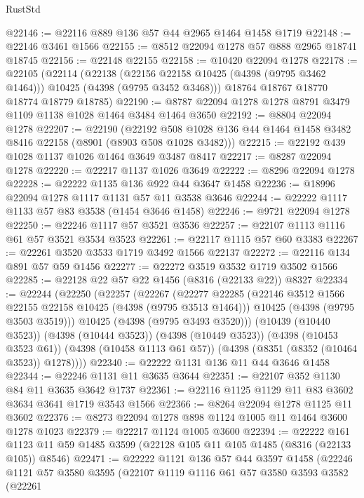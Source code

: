 \begin{lexlean}{RustStd}
\begin{coremodule}
@22146 := @22116 @889 @136 @57 @44 @2965 @1464 @1458 @1719
@22148 := @22146 @3461 @1566
@22155 := @8512 @22094 @1278 @57 @888 @2965 @18741 @18745
@22156 := @22148 @22155
@22158 := @10420 @22094 @1278
@22178 := @22105
    (@22114
      (@22138 (@22156 @22158 @10425 (@4398 (@9795 @3462 @1464))) @10425 (@4398 (@9795 @3452 @3468)))
      @18764
      @18767
      @18770
      @18774
      @18779
      @18785)
@22190 := @8787 @22094 @1278 @1278 @8791 @3479 @1109 @1138 @1028 @1464 @3484 @1464 @3650
@22192 := @8804 @22094 @1278
@22207 := @22190
    (@22192 @508 @1028 @136 @44 @1464 @1458 @3482 @8416 @22158 (@8901 (@8903 @508 @1028 @3482)))
@22215 := @22192 @439 @1028 @1137 @1026 @1464 @3649 @3487 @8417
@22217 := @8287 @22094 @1278
@22220 := @22217 @1137 @1026 @3649
@22222 := @8296 @22094 @1278
@22228 := @22222 @1135 @136 @922 @44 @3647 @1458
@22236 := @18996 @22094 @1278 @1117 @1131 @57 @11 @3538 @3646
@22244 := @22222 @1117 @1133 @57 @83 @3538 (@1454 @3646 @1458)
@22246 := @9721 @22094 @1278
@22250 := @22246 @1117 @57 @3521 @3536
@22257 := @22107 @1113 @1116 @61 @57 @3521 @3534 @3523
@22261 := @22117 @1115 @57 @60 @3383
@22267 := @22261 @3520 @3533 @1719 @3492 @1566 @22137
@22272 := @22116 @134 @891 @57 @59 @1456
@22277 := @22272 @3519 @3532 @1719 @3502 @1566
@22285 := @22128 @22 @57 @22 @1456 (@8316 (@22133 @22)) @8327
@22334 := @22244
    (@22250
      (@22257
        (@22267
          (@22277
            @22285
            (@22146 @3512 @1566 @22155 @22158 @10425 (@4398 (@9795 @3513 @1464)))
            @10425
            (@4398 (@9795 @3503 @3519)))
          @10425
          (@4398 (@9795 @3493 @3520)))
        (@10439 (@10440 @3523))
        (@4398 (@10444 @3523))
        (@4398 (@10449 @3523))
        (@4398 (@10453 @3523 @61))
        (@4398 (@10458 @1113 @61 @57))
        (@4398 (@8351 (@8352 (@10464 @3523)) @1278))))
@22340 := @22222 @1131 @136 @11 @44 @3646 @1458
@22344 := @22246 @1131 @11 @3635 @3644
@22351 := @22107 @352 @1130 @84 @11 @3635 @3642 @1737
@22361 := @22116 @1125 @1129 @11 @83 @3602 @3634 @3641 @1719 @3543 @1566
@22366 := @8264 @22094 @1278 @1125 @11 @3602
@22376 := @8273 @22094 @1278 @898 @1124 @1005 @11 @1464 @3600 @1278 @1023
@22379 := @22217 @1124 @1005 @3600
@22394 := @22222
    @161
    @1123
    @11
    @59
    @1485
    @3599
    (@22128 @105 @11 @105 @1485 (@8316 (@22133 @105)) @8546)
@22471 := @22222
    @1121
    @136
    @57
    @44
    @3597
    @1458
    (@22246
      @1121
      @57
      @3580
      @3595
      (@22107
        @1119
        @1116
        @61
        @57
        @3580
        @3593
        @3582
        (@22261

\end{coremodule}
\end{lexlean}
